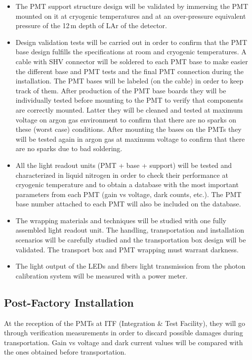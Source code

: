 \begin{itemize}
\item The PMT support structure design will be validated by immersing the PMT mounted on it at cryogenic temperatures and at an over-pressure equivalent pressure of the 12\,m depth of LAr of the detector.
\item Design validation tests will be carried out in order to confirm that the PMT base design fulfills the specifications at room and cryogenic temperatures. A cable with SHV connector will be soldered to each PMT base to make easier the different base and PMT tests and the final PMT connection during the installation. The PMT bases will be labeled (on the cable) in order to keep track of them. After production of the PMT base boards they will be individually tested before mounting to the PMT to verify that components are correctly mounted. Latter they will be cleaned and tested at maximum voltage on argon gas environment to confirm that there are no sparks on these (worst case) conditions.
After mounting the bases on the PMTs they will be tested again in argon gas at maximum voltage to confirm that there are no sparks due to bad soldering.
\item All the light readout units (PMT + base + support) will be tested and characterized in liquid nitrogen in order to check their performance at cryogenic temperature and to obtain a database with the most important parameters from each PMT (gain vs voltage, dark counts, etc.). The PMT base number attached to each PMT will also be included on the database. 
\item The wrapping materials and techniques will be studied with one fully assembled light readout unit. The handling, transportation and installation scenarios will be carefully studied and the transportation box design will be validated. The transport box and PMT wrapping must warrant darkness.
\item The light output of the LEDs and fibers light transmission from the photon calibration system will be measured with a power meter.
\end{itemize}

 \subsection{Post-Factory Installation}
 \label{sec:fddp-pd-10.2}
 
At the reception of the PMTs at ITF (Integration \& Test Facility), they will go through verification measurements in order to discard possible damages during transportation. Gain vs voltage and dark current values will be compared with the ones obtained before transportation.

